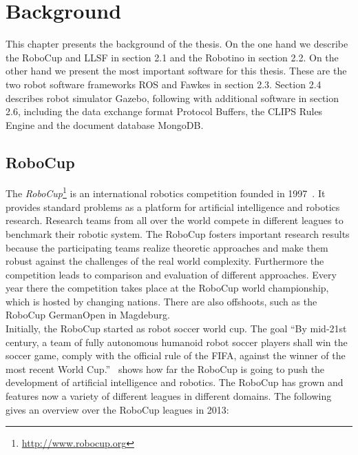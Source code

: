\chapter{Background}
This chapter presents the background of the thesis. On the one hand we describe the RoboCup and LLSF in section 2.1 and the Robotino in section 2.2. On the other hand we present the most important software for this thesis. These are the two robot software frameworks ROS and Fawkes in section 2.3. Section 2.4 describes robot simulator Gazebo, following with additional software in section 2.6, including the data exchange format Protocol Buffers, the CLIPS Rules Engine and the document database MongoDB.

\section{RoboCup}
The \textit{RoboCup}\footnote{\url{http://www.robocup.org}} is an international robotics competition founded in 1997~\cite{Robocup}. It provides standard problems as a platform for artificial intelligence and robotics research. Research teams from all over the world compete in different leagues to benchmark their robotic system. The RoboCup fosters important research results because the participating teams realize theoretic approaches and make them robust against the challenges of the real world complexity. Furthermore the competition leads to comparison and evaluation of different approaches. Every year there the competition takes place at the RoboCup world championship, which is hosted by changing nations. There are also offshoots, such as the RoboCup GermanOpen in Magdeburg.\\
Initially, the RoboCup started as robot soccer world cup. The goal ``By mid-21st century, a team of fully autonomous humanoid robot soccer players shall win the soccer game, comply with the official rule of the FIFA, against the winner of the most recent World Cup.''~\cite{robocup_goal} shows how far the RoboCup is going to push the development of artificial intelligence and robotics. The RoboCup has grown and features now a variety of different leagues in different domains. The following gives an overview over the RoboCup leagues in 2013:\\
